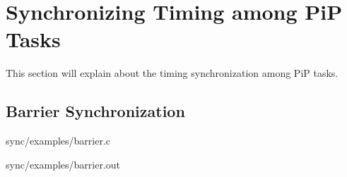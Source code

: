 
\section{Synchronizing Timing among PiP Tasks}

This section will explain about the timing synchronization among PiP
tasks.

\subsection{Barrier Synchronization}

 {sync/examples/barrier.c}

 {sync/examples/barrier.out}

